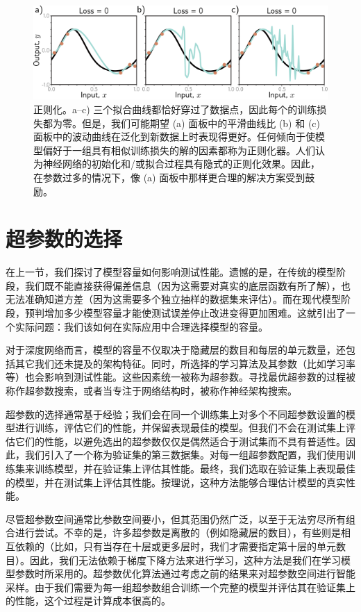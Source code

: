 \begin{figure}[ht!]
\centering
\includegraphics[width=0.7\linewidth]{png/chapter8/PerfSmoothness2.png}
\caption{正则化。a–c) 三个拟合曲线都恰好穿过了数据点，因此每个的训练损失都为零。但是，我们可能期望 (a) 面板中的平滑曲线比 (b) 和 (c) 面板中的波动曲线在泛化到新数据上时表现得更好。任何倾向于使模型偏好于一组具有相似训练损失的解的因素都称为正则化器。人们认为神经网络的初始化和/或拟合过程具有隐式的正则化效果。因此，在参数过多的情况下，像 (a) 面板中那样更合理的解决方案受到鼓励。}
\end{figure}

\section{超参数的选择}
在上一节，我们探讨了模型容量如何影响测试性能。遗憾的是，在传统的模型阶段，我们既不能直接获得偏差信息（因为这需要对真实的底层函数有所了解），也无法准确知道方差（因为这需要多个独立抽样的数据集来评估）。而在现代模型阶段，预判增加多少模型容量才能使测试误差停止改进变得更加困难。这就引出了一个实际问题：我们该如何在实际应用中合理选择模型的容量。

对于深度网络而言，模型的容量不仅取决于隐藏层的数目和每层的单元数量，还包括其它我们还未提及的架构特征。同时，所选择的学习算法及其参数（比如学习率等）也会影响到测试性能。这些因素统一被称为超参数。寻找最优超参数的过程被称作超参数搜索，或者当专注于网络结构时，被称作神经架构搜索。

超参数的选择通常基于经验；我们会在同一个训练集上对多个不同超参数设置的模型进行训练，评估它们的性能，并保留表现最佳的模型。但我们不会在测试集上评估它们的性能，以避免选出的超参数仅仅是偶然适合于测试集而不具有普适性。因此，我们引入了一个称为验证集的第三数据集。对每一组超参数配置，我们使用训练集来训练模型，并在验证集上评估其性能。最终，我们选取在验证集上表现最佳的模型，并在测试集上评估其性能。按理说，这种方法能够合理估计模型的真实性能。

尽管超参数空间通常比参数空间要小，但其范围仍然广泛，以至于无法穷尽所有组合进行尝试。不幸的是，许多超参数是离散的（例如隐藏层的数目），有些则是相互依赖的（比如，只有当存在十层或更多层时，我们才需要指定第十层的单元数目）。因此，我们无法依赖于梯度下降方法来进行学习，这种方法是我们在学习模型参数时所采用的。超参数优化算法通过考虑之前的结果来对超参数空间进行智能采样。由于我们需要为每一组超参数组合训练一个完整的模型并评估其在验证集上的性能，这个过程是计算成本很高的。
